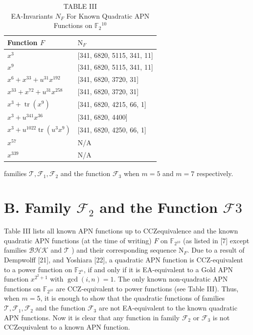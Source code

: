 \documentclass[10pt]{article}
\begin{document}
\begin{table}[h]
\begin{center}
\captionsetup{labelformat=empty}
\caption{TABLE III\\
EA-Invariants $N_{F}$ For Known Quadratic APN Functions on $\mathbb{F}_{2}{ }^{10}$}
\begin{tabular}{|l|l|}
\hline
Function $F$ & $\mathrm{N}_{F}$ \\
\hline
$x^{3}$ & [341, 6820, 5115, 341, 11] \\
\hline
$x^{9}$ & [341, 6820, 5115, 341, 11] \\
\hline
$x^{6}+x^{33}+u^{31} x^{192}$ & [341, 6820, 3720, 31] \\
\hline
$x^{33}+x^{72}+u^{31} x^{258}$ & [341, 6820, 3720, 31] \\
\hline
$x^{3}+\operatorname{tr}\left(x^{9}\right)$ & [341, 6820, 4215, 66, 1] \\
\hline
$x^{3}+u^{341} x^{36}$ & [341, 6820, 4400] \\
\hline
$x^{3}+u^{1022} \operatorname{tr}\left(u^{3} x^{9}\right)$ & [341, 6820, 4250, 66, 1] \\
\hline
$x^{57}$ & N/A \\
\hline
$x^{339}$ & N/A \\
\hline
\end{tabular}
\end{center}
\end{table}

families $\mathcal{T}, \mathcal{F}_{1}, \mathcal{F}_{2}$ and the function $\mathcal{F}_{3}$ when $m=5$ and $m=7$ respectively.

\section*{B. Family $\mathcal{F}_{2}$ and the Function $\mathcal{F} 3$}
Table III lists all known APN functions up to CCZequivalence and the known quadratic APN functions (at the time of writing) $F$ on $\mathbb{F}_{2^{10}}$ (as listed in [7] except families $\mathcal{B} \mathcal{H} \mathcal{K}$ and $\mathcal{T}$ ) and their corresponding sequence $\mathrm{N}_{F}$. Due to a result of Dempwolff [21], and Yoshiara [22], a quadratic APN function is CCZ-equivalent to a power function on $\mathbb{F}_{2^{n}}$, if and only if it is EA-equivalent to a Gold APN function $x^{2^{2}+1}$ with $\operatorname{gcd}(i, n)=1$. The only known non-quadratic APN functions on $\mathbb{F}_{2^{10}}$ are CCZ-equivalent to power functions (see Table III). Thus, when $m=5$, it is enough to show that the quadratic functions of families $\mathcal{T}, \mathcal{F}_{1}, \mathcal{F}_{2}$ and the function $\mathcal{F}_{3}$ are not EA-equivalent to the known quadratic APN functions. Now it is clear that any function in family $\mathcal{F}_{2}$ or $\mathcal{F}_{3}$ is not CCZequivalent to a known APN function.
\end{document}
